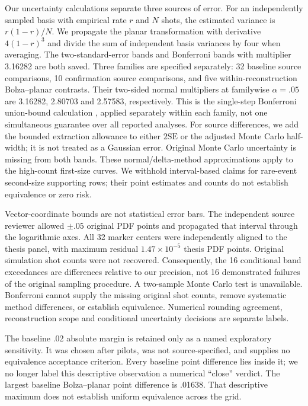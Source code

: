 \documentclass[11pt]{article}
\begin{document}
Our uncertainty calculations separate three sources of error. For an independently sampled basis with empirical rate $r$ and $N$ shots, the estimated variance is $r(1-r)/N$. We propagate the planar transformation with derivative $4(1-r)^3$ and divide the sum of independent basis variances by four when averaging. The two-standard-error bands and Bonferroni bands with multiplier 3.16282 are both saved. Three families are specified separately: 32 baseline source comparisons, 10 confirmation source comparisons, and five within-reconstruction Bolza--planar contrasts. Their two-sided normal multipliers at familywise $\alpha=.05$ are 3.16282, 2.80703 and 2.57583, respectively. This is the single-step Bonferroni union-bound calculation \citep{multiple}, applied separately within each family, not one simultaneous guarantee over all reported analyses. For source differences, we add the bounded extraction allowance to either $2\mathrm{SE}$ or the adjusted Monte Carlo half-width; it is not treated as a Gaussian error. Original Monte Carlo uncertainty is missing from both bands. These normal/delta-method approximations apply to the high-count first-size curves. We withhold interval-based claims for rare-event second-size supporting rows; their point estimates and counts do not establish equivalence or zero risk.

Vector-coordinate bounds are not statistical error bars. The independent source reviewer allowed $\pm .05$ original PDF points and propagated that interval through the logarithmic axes. All 32 marker centers were independently aligned to the thesis panel, with maximum residual $1.47\times10^{-5}$ thesis PDF points. Original simulation shot counts were not recovered. Consequently, the 16 conditional band exceedances are differences relative to our precision, not 16 demonstrated failures of the original sampling procedure. A two-sample Monte Carlo test is unavailable. Bonferroni cannot supply the missing original shot counts, remove systematic method differences, or establish equivalence. Numerical rounding agreement, reconstruction scope and conditional uncertainty decisions are separate labels.

The baseline .02 absolute margin is retained only as a named exploratory sensitivity. It was chosen after pilots, was not source-specified, and supplies no equivalence acceptance criterion. Every baseline point difference lies inside it; we no longer label this descriptive observation a numerical ``close'' verdict. The largest baseline Bolza--planar point difference is .01638. That descriptive maximum does not establish uniform equivalence across the grid.
\end{document}
